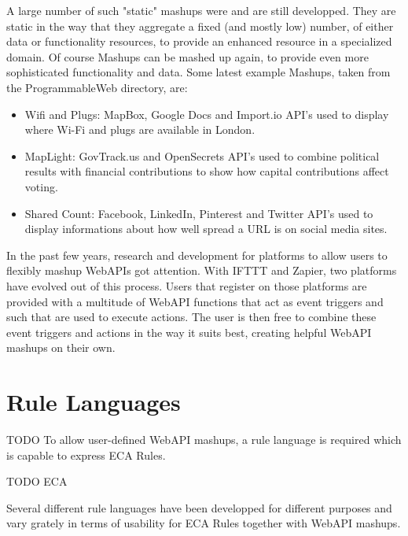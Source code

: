 A large number of such "static" mashups were and are still developped.
They are static in the way that they aggregate a fixed (and mostly low) number, of either data or functionality resources, to provide an enhanced resource in a specialized domain.
Of course Mashups can be mashed up again, to provide even more sophisticated functionality and data.
Some latest example Mashups, taken from the ProgrammableWeb\cite{wwwProgrammableWeb} directory, are:

\begin{itemize}
  \item Wifi and Plugs\cite{wwwWifiAndPlugs}: MapBox, Google Docs and Import.io API's used to display where Wi-Fi and plugs are available in London.
  \item MapLight\cite{wwwMapLight}: GovTrack.us and OpenSecrets API's used to combine political results with financial contributions to show how capital contributions affect voting.
  \item Shared Count\cite{wwwSharedCount}: Facebook, LinkedIn, Pinterest and Twitter API's used to display informations about how well spread a URL is on social media sites.
\end{itemize}

In the past few years, research and development for platforms to allow users to flexibly mashup WebAPIs got attention.
With IFTTT and Zapier, two platforms have evolved out of this process.
Users that register on those platforms are provided with a multitude of WebAPI functions that act as event triggers and such that are used to execute actions.
The user is then free to combine these event triggers and actions in the way it suits best, creating helpful WebAPI mashups on their own.






\section{Rule Languages}

TODO
To allow user-defined WebAPI mashups, a rule language is required which is capable to express ECA Rules. 


TODO
ECA


Several different rule languages have been developped for different purposes and vary grately in terms of usability for ECA Rules together with WebAPI mashups.


